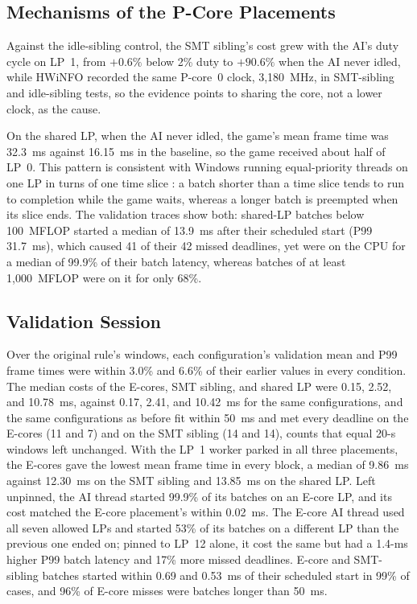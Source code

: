 \documentclass[conference]{IEEEtran}
\begin{document}
\subsection{Mechanisms of the P-Core Placements}
\label{sec:mech}
Against the idle-sibling control, the SMT sibling's cost grew with the AI's duty cycle on LP~1, from $+0.6\%$ below 2\% duty to $+90.6\%$ when the AI never idled, while HWiNFO recorded the same P-core~0 clock, 3,180~MHz, in SMT-sibling and idle-sibling tests, so the evidence points to sharing the core, not a lower clock, as the cause.

On the shared LP, when the AI never idled, the game's mean frame time was 32.3~ms against 16.15~ms in the baseline, so the game received about half of LP~0. This pattern is consistent with Windows running equal-priority threads on one LP in turns of one time slice \cite{mssched}: a batch shorter than a time slice tends to run to completion while the game waits, whereas a longer batch is preempted when its slice ends. The validation traces show both: shared-LP batches below 100~MFLOP started a median of 13.9~ms after their scheduled start (P99 31.7~ms), which caused 41 of their 42 missed deadlines, yet were on the CPU for a median of 99.9\% of their batch latency, whereas batches of at least 1,000~MFLOP were on it for only 68\%.

\subsection{Validation Session}
\label{sec:validation}
Over the original rule's windows, each configuration's validation mean and P99 frame times were within 3.0\% and 6.6\% of their earlier values in every condition. The median costs of the E-cores, SMT sibling, and shared LP were 0.15, 2.52, and 10.78~ms, against 0.17, 2.41, and 10.42~ms for the same configurations, and the same configurations as before fit within 50~ms and met every deadline on the E-cores (11 and 7) and on the SMT sibling (14 and 14), counts that equal 20-s windows left unchanged. With the LP~1 worker parked in all three placements, the E-cores gave the lowest mean frame time in every block, a median of 9.86~ms against 12.30~ms on the SMT sibling and 13.85~ms on the shared LP. Left unpinned, the AI thread started 99.9\% of its batches on an E-core LP, and its cost matched the E-core placement's within 0.02~ms. The E-core AI thread used all seven allowed LPs and started 53\% of its batches on a different LP than the previous one ended on; pinned to LP~12 alone, it cost the same but had a 1.4-ms higher P99 batch latency and 17\% more missed deadlines. E-core and SMT-sibling batches started within 0.69 and 0.53~ms of their scheduled start in 99\% of cases, and 96\% of E-core misses were batches longer than 50~ms.
\end{document}
